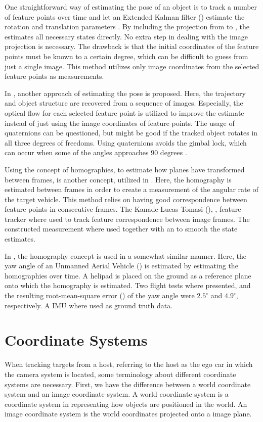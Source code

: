 One straightforward way of estimating the  pose of an object is to track a number of feature points over time and let an Extended Kalman filter (\abbrEKF) estimate the rotation and translation parameters \cite{Hajimolahoseini:2014}.
By including the projection from  to , the \abbrEKF estimates all necessary states directly.
No extra step in dealing with the image projection is necessary.
The drawback is that the initial  coordinates of the feature points must be known to a certain degree, which can be difficult to guess from just a single image.
This method utilizes only image coordinates from the selected feature points as measurements.

In \cite{Blostein:2000}, another approach of estimating the  pose is proposed.
Here, the  trajectory and object structure are recovered from a sequence of images.
Especially, the optical flow for each selected feature point is utilized to improve the estimate instead of just using the image coordinates of feature points.
The usage of quaternions can be questioned, but might be good if the tracked object rotates in all three degrees of freedoms.
Using quaternions avoids the gimbal lock, which can occur when some of the angles approaches 90 degrees \cite{Gustafsson:2012}.

Using the concept of homographies, \ie to estimate how planes have transformed between frames, is another concept, utilized in \cite{Gabb:2013}.
Here, the homography is estimated between frames in order to create a measurement of the angular rate of the target vehicle.
This method relies on having good correspondence between feature points in consecutive frames.
The Kanade-Lucas-Tomasi (\abbrKLT), \eg \cite{Szeliski:2011}, feature tracker where used to track feature correspondence between image frames.
The constructed measurement where used together with an \abbrEKF to smooth the state estimates.

In \cite{Mondragon:2010}, the homography concept is used in a somewhat similar manner.
Here, the yaw angle of an Unmanned Aerial Vehicle (\abbrUAV) is estimated by estimating the homographies over time.
A helipad is placed on the ground as a reference plane onto which the homography is estimated.
Two flight tests where presented, and the resulting root-mean-square error (\abbrRMSE) of the yaw angle were $2.5^\circ$ and $4.9^\circ$, respectively.
A IMU where used as ground truth data.

\section{Coordinate Systems}
When tracking targets from a host, referring to the host as the ego car in which the camera system is located, some terminology about different coordinate systems are necessary.
First, we have the difference between a world coordinate system  and an image coordinate system.
A world coordinate system is a coordinate system in  representing how objects are positioned in the world.
An image coordinate system is the  world coordinates projected onto a  image plane.

